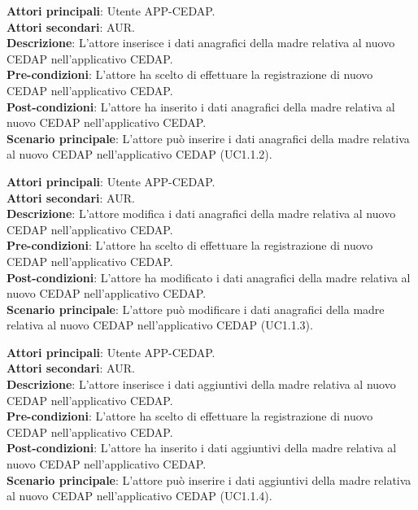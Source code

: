 \documentclass[a4paper]{article}
\newcounter{subsubsubsection}[subsubsection]
\begin{document}
\label{UC1.1.2}

\textbf{Attori principali}: Utente APP-CEDAP.
\\
\textbf{Attori secondari}: AUR.
\\
\textbf{Descrizione}: L'attore inserisce i dati anagrafici della madre relativa al nuovo CEDAP nell'applicativo CEDAP.
\\
\textbf{Pre-condizioni}: L'attore ha scelto di effettuare la registrazione di nuovo CEDAP nell'applicativo CEDAP.
\\
\textbf{Post-condizioni}: L'attore ha inserito i dati anagrafici della madre relativa al nuovo CEDAP nell'applicativo CEDAP.
\\
\textbf{Scenario principale}: L'attore può inserire i dati anagrafici della madre relativa al nuovo CEDAP nell'applicativo CEDAP (UC1.1.2).

\label{UC1.1.3}

\textbf{Attori principali}: Utente APP-CEDAP.
\\
\textbf{Attori secondari}: AUR.
\\
\textbf{Descrizione}: L'attore modifica i dati anagrafici della madre relativa al nuovo CEDAP nell'applicativo CEDAP.
\\
\textbf{Pre-condizioni}: L'attore ha scelto di effettuare la registrazione di nuovo CEDAP nell'applicativo CEDAP.
\\
\textbf{Post-condizioni}: L'attore ha modificato i dati anagrafici della madre relativa al nuovo CEDAP nell'applicativo CEDAP.
\\
\textbf{Scenario principale}: L'attore può modificare i dati anagrafici della madre relativa al nuovo CEDAP nell'applicativo CEDAP (UC1.1.3).


\label{UC1.1.4}

\textbf{Attori principali}: Utente APP-CEDAP.
\\
\textbf{Attori secondari}: AUR.
\\
\textbf{Descrizione}: L'attore inserisce i dati aggiuntivi della madre relativa al nuovo CEDAP nell'applicativo CEDAP.
\\
\textbf{Pre-condizioni}: L'attore ha scelto di effettuare la registrazione di nuovo CEDAP nell'applicativo CEDAP.
\\
\textbf{Post-condizioni}: L'attore ha inserito i dati aggiuntivi della madre relativa al nuovo CEDAP nell'applicativo CEDAP.
\\
\textbf{Scenario principale}: L'attore può inserire i dati aggiuntivi della madre relativa al nuovo CEDAP nell'applicativo CEDAP (UC1.1.4).
\end{document}
